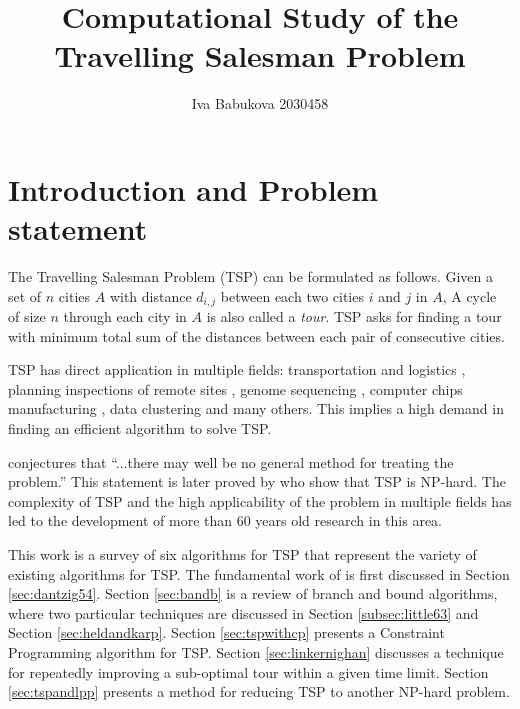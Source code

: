 \documentclass[a4paper,12pt]{article}
\author{Iva Babukova 2030458}
\title{Computational Study of the Travelling Salesman Problem}
\begin{document}

  
\maketitle



\section{Introduction and Problem statement}
The Travelling Salesman Problem (TSP) can be formulated as follows.
Given a set of $n$ cities $A$ with distance $d_{i,j}$ between each two cities $i$ and $j$ in $A$, A cycle of size $n$ through each city in $A$ is also called a \textit{tour}. TSP asks for finding a tour with minimum total sum of the distances between each pair of consecutive cities.

TSP has direct application in multiple fields: transportation and logistics \citep{Flood56}, planning inspections of remote sites \citep{Mahalanobis}, genome sequencing \citep{genomesequencing}, computer chips manufacturing \citep{Barbagallo96}, data clustering \citep{McCormick72} and many others. This implies a high demand in finding an efficient algorithm to solve TSP.

\citet{Flood56} conjectures that ``...there may well be no general method for treating the problem.'' This statement is later proved by \citet{thebible} who show that TSP is NP-hard. %
The complexity of TSP and the high applicability of the problem in multiple fields has led to the development of more than 60 years old research in this area.

This work is a survey of six algorithms for TSP that represent the variety of existing algorithms for TSP. The fundamental work of \citet{Dantzig54} is first discussed in Section \ref{sec:dantzig54}. Section \ref{sec:bandb} is a review of branch and bound algorithms, where two particular techniques are discussed in Section \ref{subsec:little63} and Section \ref{sec:heldandkarp}. Section \ref{sec:tspwithcp} presents a Constraint Programming algorithm for TSP. Section \ref{sec:linkernighan} discusses a technique for repeatedly improving a sub-optimal tour within a given time limit. Section \ref{sec:tspandlpp} presents a method for reducing TSP to another NP-hard problem.
\end{document}
